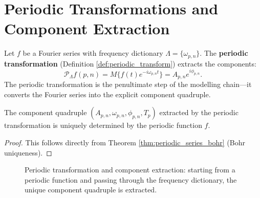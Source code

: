 \section{Periodic Transformations and Component Extraction}

\begin{definition}\label{def:periodic_transform_component}
Let $f$ be a Fourier series with frequency dictionary $\Lambda = \{\omega_{p,n}\}$. The \textbf{periodic transformation} (Definition \ref{def:periodic_transform}) extracts the components:
\[
\mathcal{P}_\Lambda f(p,n) = M\{f(t) e^{-i\omega_{p,n} t}\} = A_{p,n} e^{i\phi_{p,n}}.
\]
The periodic transformation is the penultimate step of the modelling chain---it converts the Fourier series into the explicit component quadruple.
\end{definition}

\begin{theorem}\label{thm:component_uniqueness}
The component quadruple $(A_{p,n}, \omega_{p,n}, \phi_{p,n}, T_p)$ extracted by the periodic transformation is uniquely determined by the periodic function $f$.
\end{theorem}

\begin{proof}
This follows directly from Theorem \ref{thm:periodic_series_bohr} (Bohr uniqueness).
\end{proof}

\begin{figure}[htbp]
\centering
\begin{fittikz}
\end{fittikz}
\caption{Periodic transformation and component extraction: starting from a periodic function and passing through the frequency dictionary, the unique component quadruple is extracted.}
\label{fig:periodic_transform_extraction}
\end{figure}

